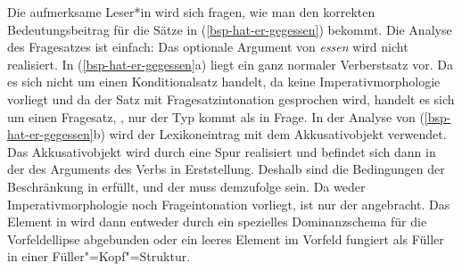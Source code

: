 

Die aufmerksame Leser*in wird sich fragen, wie man den korrekten Bedeutungsbeitrag für die Sätze in
(\ref{bsp-hat-er-gegessen}) bekommt. Die Analyse des Fragesatzes ist einfach: Das optionale Argument
von \emph{essen} wird nicht realisiert. In (\ref{bsp-hat-er-gegessen}a) liegt ein ganz normaler Verberstsatz
vor. Da es sich nicht um einen Konditionalsatz handelt, da keine Imperativmorphologie vorliegt
und da der Satz mit Fragesatzintonation gesprochen wird, handelt es sich um einen Fragesatz,
\dash, nur der Typ  kommt als \modew in Frage. In der Analyse von
(\ref{bsp-hat-er-gegessen}b) wird der Lexikoneintrag mit dem Akkusativobjekt verwendet. Das Akkusativobjekt
wird durch eine Spur realisiert und befindet sich dann in der \slashl des Arguments des Verbs
in Erststellung. Deshalb sind die Bedingungen der Beschränkung in  erfüllt, und
der \modew muss demzufolge  sein.
Da weder Imperativmorphologie noch Frageintonation vorliegt, ist nur der \modew {}
angebracht. Das Element in \slasch wird dann entweder durch ein spezielles Dominanzschema für
die Vorfeldellipse abgebunden \citep{Mueller2004e,VMY2024a} oder ein leeres Element im Vorfeld
fungiert als Füller in einer Füller"=Kopf"=Struktur.



